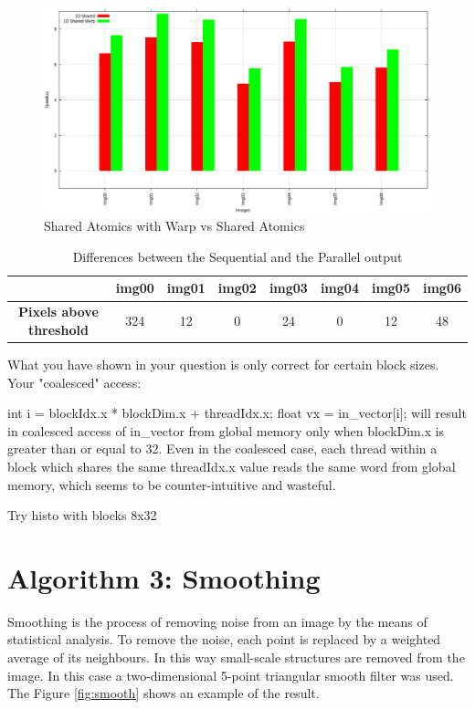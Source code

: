 \documentclass[a4paper]{article}
\begin{document}
\begin{figure}[!ht]
    \centering
    \includegraphics[width=0.7\linewidth]{res/new/histogram_warp}
    \caption{Shared Atomics with Warp vs Shared Atomics}
    \label{fig:sawvsa}
\end{figure}
\FloatBarrier

\begin{table}[!ht]
\centering
\caption{Differences between the Sequential and the Parallel output}
\label{pxabh}
\begin{tabular}{|c|l|c|c|l|l|l|l|}
\hline
\textbf{}                        & \textbf{img00}           & \textbf{img01} & \textbf{img02} & \textbf{img03}          & \textbf{img04}         & \textbf{img05}          & \textbf{img06}          \\ \hline
\textbf{Pixels above  threshold} & \multicolumn{1}{c|}{324} & 12             & 0              & \multicolumn{1}{c|}{24} & \multicolumn{1}{c|}{0} & \multicolumn{1}{c|}{12} & \multicolumn{1}{c|}{48} \\ \hline
\end{tabular}
\end{table}
 
 
 What you have shown in your question is only correct for certain block sizes. Your "coalesced" access:

int i = blockIdx.x * blockDim.x + threadIdx.x;
float vx = in\_vector[i];
will result in coalesced access of in\_vector from global memory only when blockDim.x is greater than or equal to 32. Even in the coalesced case, each thread within a block which shares the same threadIdx.x value reads the same word from global memory, which seems to be counter-intuitive and wasteful.

Try histo with blocks 8x32
\section{Algorithm 3: Smoothing}
\label{sec:smoo}
Smoothing is the process of removing noise from an image by the means of statistical analysis. To remove the noise, each point is replaced by a weighted average of its neighbours. In this way small-scale structures are removed from the image. In this case a two-dimensional 5-point triangular smooth filter was used. The Figure \ref{fig:smooth} shows an example of the result.
\end{document}
